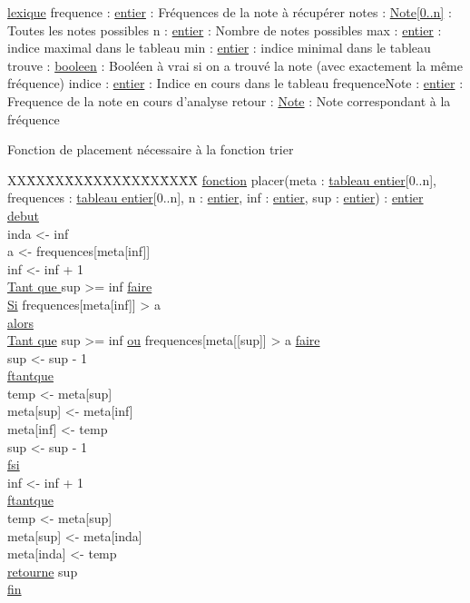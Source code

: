 \ul{lexique}\newline
frequence : \ul{entier} : Fréquences de la note à récupérer\newline
notes : \ul{Note[0..n]} : Toutes les notes possibles\newline
n :  \ul{entier} : Nombre de notes possibles\newline
max : \ul{entier} : indice maximal dans le tableau\newline
min : \ul{entier} : indice minimal dans le tableau\newline
trouve : \ul{booleen} : Booléen à vrai si on a trouvé la note (avec exactement la même fréquence)\newline
indice : \ul{entier} : Indice en cours dans le tableau\newline
frequenceNote : \ul{entier} : Frequence de la note en cours d'analyse\newline
retour : \ul{Note} : Note correspondant à la fréquence\newline

Fonction de placement nécessaire à la fonction trier\newline

\begin{tabbing}
\kill XX\=XX\=XX\=XX\=XX\=XX\=XX\=XX\=XX\=XX\=
\kill
\ul{fonction} placer(meta : \ul{tableau entier}[0..n], frequences : \ul{tableau entier}[0..n], n : \ul{entier}, inf : \ul{entier}, sup : \ul{entier}) : \ul{entier}\\
\ul{debut}\\
    \>inda <- inf\\
    \>a <- frequences[meta[inf]]\\
    \>inf <- inf + 1\\
    \>\ul{Tant que } sup >= inf \ul{faire}\\
        \>\>\ul{Si} frequences[meta[inf]] > a\\
        \>\>\ul{alors}\\
            \>\>\>\ul{Tant que} sup >= inf \ul{ou} frequences[meta[[sup]] > a \ul{faire}\\
                \>\>\>\>sup <- sup - 1\\
            \>\>\>\ul{ftantque}\\
            \>\>\>temp <- meta[sup]\\
            \>\>\>meta[sup] <- meta[inf]\\
            \>\>\>meta[inf] <- temp\\
            \>\>\>sup <- sup - 1\\
        \>\>\ul{fsi}\\
        \>\>inf <- inf + 1\\
    \>\ul{ftantque}\\
    \>temp <- meta[sup]\\
    \>meta[sup] <- meta[inda]\\
    \>meta[inda] <- temp\\
    \>\ul{retourne} sup\\
\ul{fin}\\
\end{tabbing}

